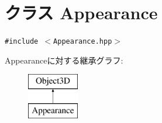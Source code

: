 \hypertarget{classm3g_1_1Appearance}{
\section{クラス Appearance}
\label{classm3g_1_1Appearance}
}
{\tt \#include $<$Appearance.hpp$>$}

Appearanceに対する継承グラフ:\begin{figure}[H]
\begin{center}
\leavevmode
\includegraphics[height=2cm]{classm3g_1_1Appearance}
\end{center}
\end{figure}
